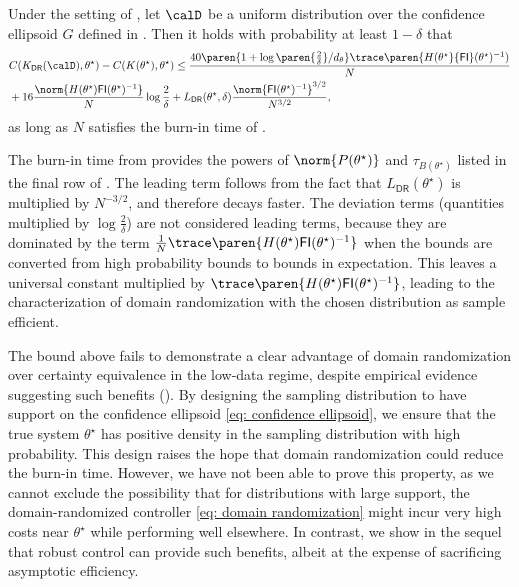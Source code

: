 \begin{theorem}
    \label{thm: Domain Randomization Upper Bound}
    Under the setting of , let $\calD$ be a uniform distribution over the confidence ellipsoid $G$ defined in . Then it holds with probability at least $1-\delta$ that 
    \begin{align}
        &C(K_{\mathsf{DR}}(\calD), \theta^\star) - C(K(\theta^\star), \theta^\star) \nonumber \leq \frac{40\paren{1+\log\paren{\frac{2}{\delta}}/d_\theta}\trace\paren{H(\theta^\star}{\mathsf{FI}}(\theta^\star)^{-1})}{N} \\
        &+ 16\frac{\norm{H(\theta^\star)\mathsf{FI}(\theta^\star)^{-1}}}{N}\log\frac{2}{\delta} + L_{\mathsf{DR}}(\theta^\star, \delta)\frac{\norm{\mathsf{FI}(\theta^\star)^{-1}}^{3/2}}{N^{3/2}},\label{eq:DR upper bound w/ unif dist}
    \end{align}
    as long as $N$ satisfies the burn-in time of .
\end{theorem}
The burn-in time from  provides the powers of $\norm{P(\theta^\star)}$ and $\tau_{B(\theta^\star)}$ listed in the final row of . The leading term follows from the fact that $L_{\mathsf{DR}}(\theta^\star)$ is multiplied by $N^{-3/2}$, and therefore decays faster. The deviation terms (quantities multiplied by $\log\frac{2}{\delta}$) are not considered leading terms, because they are dominated by the term 
$\frac{1}{N}\trace\paren{H(\theta^\star) \mathsf{FI}(\theta^\star)^{-1}}$ when the bounds are converted from high probability bounds to bounds in expectation.
This leaves a universal constant multiplied by  $\trace\paren{H(\theta^\star) \mathsf{FI}(\theta^\star)^{-1}}$, leading to the characterization of domain randomization with the chosen distribution as sample efficient. 



The bound above fails to demonstrate a clear advantage of domain randomization over certainty equivalence in the low-data regime, despite empirical evidence suggesting such benefits (). By designing the sampling distribution to have support on the confidence ellipsoid \eqref{eq: confidence ellipsoid}, we ensure that the true system $\theta^\star$ has positive density in the sampling distribution with high probability. This design raises the hope that domain randomization could reduce the burn-in time. However, we have not been able to prove this property, as we cannot exclude the possibility that for distributions with large support, the domain-randomized controller \eqref{eq: domain randomization} might incur very high costs  near $\theta^\star$ while performing well elsewhere. In contrast, we show in the sequel that robust control can provide such benefits, albeit at the expense of sacrificing asymptotic efficiency.


